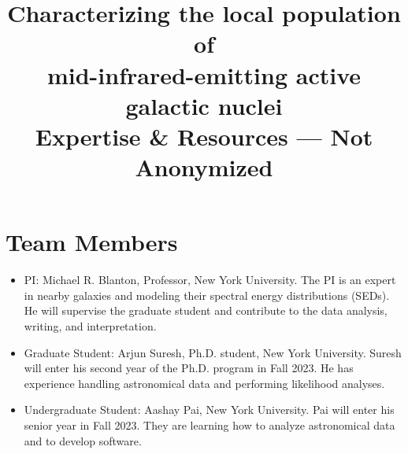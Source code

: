 \documentclass[12pt, preprint]{hacked-aastex}
\begin{document}
\pagestyle{plain}

\newcommand{\imtxt}[1]{\textcolor{red}{#1}}
\newcommand{\imsout}[1]{\textcolor{red}{\sout{#1}}}
\newcommand{\sersic}{S\'{e}rsic}

\title{{\large Characterizing the local population of \\
mid-infrared-emitting active galactic nuclei}
\\
\large Expertise \& Resources --- Not Anonymized} 

\maketitle

\section{Team Members}\label{sec:team}

\begin{itemize}
\item PI: Michael R. Blanton, Professor, New York University. The 
PI is an expert in nearby galaxies and modeling their spectral
energy distributions (SEDs). He will supervise the graduate student
and contribute to the data analysis, writing, and interpretation.
\item Graduate Student: Arjun Suresh, Ph.D. student, New York University.
Suresh will enter his second year of the Ph.D. program in Fall 2023.
He has experience handling astronomical data and performing likelihood
analyses.
\item Undergraduate Student: Aashay Pai, New York University. Pai 
will enter his senior year in Fall 2023. They are learning how 
to analyze astronomical data and to develop software.
\end{itemize}

\clearpage
\end{document}
